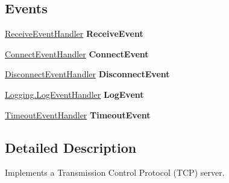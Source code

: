 \subsection*{Events}
\begin{DoxyCompactItemize}
\item 
\hypertarget{classAsterion_1_1Server_a86e70015d1cbdbb93aec3e752d6f457a}{\hyperlink{namespaceAsterion_a29f5d934388f3024f1acb2a76ca181d4}{Receive\-Event\-Handler} {\bfseries Receive\-Event}}\label{classAsterion_1_1Server_a86e70015d1cbdbb93aec3e752d6f457a}

\item 
\hypertarget{classAsterion_1_1Server_a0756512539b44fc1a57b6dac1bdca1be}{\hyperlink{namespaceAsterion_a4eb424f673809e9b97a563ddd0f4db12}{Connect\-Event\-Handler} {\bfseries Connect\-Event}}\label{classAsterion_1_1Server_a0756512539b44fc1a57b6dac1bdca1be}

\item 
\hypertarget{classAsterion_1_1Server_a9a39e5289a373e7f5d727cad96f69a0a}{\hyperlink{namespaceAsterion_a52e1669733e14e0bf24951e126e81546}{Disconnect\-Event\-Handler} {\bfseries Disconnect\-Event}}\label{classAsterion_1_1Server_a9a39e5289a373e7f5d727cad96f69a0a}

\item 
\hypertarget{classAsterion_1_1Server_aa8099aa7ba7bcc1c4b5519ca9cf9c549}{\hyperlink{namespaceAsterion_1_1Logging_afaa8d5b6776c6635522846d7f2751ca9}{Logging.\-Log\-Event\-Handler} {\bfseries Log\-Event}}\label{classAsterion_1_1Server_aa8099aa7ba7bcc1c4b5519ca9cf9c549}

\item 
\hypertarget{classAsterion_1_1Server_ae7e3538c394854a30299f7c2205ba825}{\hyperlink{namespaceAsterion_a7857afea4386501bece91ccfcf0096fc}{Timeout\-Event\-Handler} {\bfseries Timeout\-Event}}\label{classAsterion_1_1Server_ae7e3538c394854a30299f7c2205ba825}

\end{DoxyCompactItemize}


\subsection{Detailed Description}
Implements a Transmission Control Protocol (T\-C\-P) server. 

